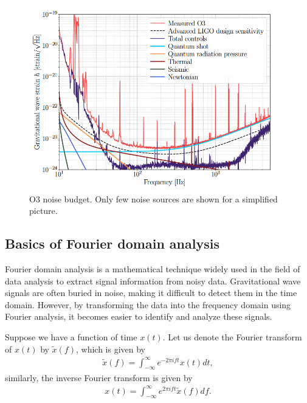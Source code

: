 \begin{figure}
    \centering
    \includegraphics[width=\textwidth]{figures/basic_data_analysis/O3_noise_budget.PNG}
    \caption{O3 noise budget. Only few noise sources are shown for a simplified picture. \cite{aLIGO:2020wna}}
    \label{fig:O3_noise_budget}
\end{figure}







\subsection{Basics of Fourier domain analysis}

Fourier domain analysis is a mathematical technique widely used in the field of data analysis to extract signal information from noisy data. Gravitational wave signals are often buried in noise, making it difficult to detect them in the time domain. However, by transforming the data into the frequency domain using Fourier analysis, it becomes easier to identify and analyze these signals.


Suppose we have a function of time $x(t)$. Let us denote the Fourier transform of $x(t)$ by $\tilde{x}(f)$, which is given by
    \begin{align}
        \tilde{x}(f) = \int_{-\infty}^{\infty} e^{-2\pi i ft} x(t) dt,
    \end{align}
    similarly, the inverse Fourier transform is given by
    \begin{align}
        x(t) = \int_{-\infty}^{\infty} e^{2\pi i f t} \tilde{x}(f) df.
    \end{align}

